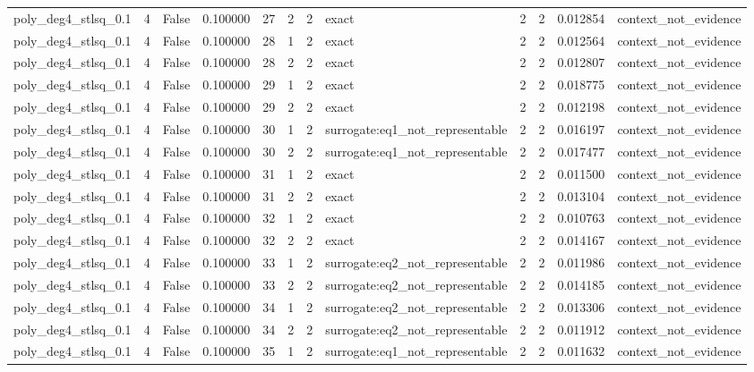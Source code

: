 \begin{tabular}{lrrrrrrlrrrl}
poly\_deg4\_stlsq\_0.1 & 4 & False & 0.100000 & 27 & 2 & 2 & exact & 2 & 2 & 0.012854 & context\_not\_evidence \\
poly\_deg4\_stlsq\_0.1 & 4 & False & 0.100000 & 28 & 1 & 2 & exact & 2 & 2 & 0.012564 & context\_not\_evidence \\
poly\_deg4\_stlsq\_0.1 & 4 & False & 0.100000 & 28 & 2 & 2 & exact & 2 & 2 & 0.012807 & context\_not\_evidence \\
poly\_deg4\_stlsq\_0.1 & 4 & False & 0.100000 & 29 & 1 & 2 & exact & 2 & 2 & 0.018775 & context\_not\_evidence \\
poly\_deg4\_stlsq\_0.1 & 4 & False & 0.100000 & 29 & 2 & 2 & exact & 2 & 2 & 0.012198 & context\_not\_evidence \\
poly\_deg4\_stlsq\_0.1 & 4 & False & 0.100000 & 30 & 1 & 2 & surrogate:eq1\_not\_representable & 2 & 2 & 0.016197 & context\_not\_evidence \\
poly\_deg4\_stlsq\_0.1 & 4 & False & 0.100000 & 30 & 2 & 2 & surrogate:eq1\_not\_representable & 2 & 2 & 0.017477 & context\_not\_evidence \\
poly\_deg4\_stlsq\_0.1 & 4 & False & 0.100000 & 31 & 1 & 2 & exact & 2 & 2 & 0.011500 & context\_not\_evidence \\
poly\_deg4\_stlsq\_0.1 & 4 & False & 0.100000 & 31 & 2 & 2 & exact & 2 & 2 & 0.013104 & context\_not\_evidence \\
poly\_deg4\_stlsq\_0.1 & 4 & False & 0.100000 & 32 & 1 & 2 & exact & 2 & 2 & 0.010763 & context\_not\_evidence \\
poly\_deg4\_stlsq\_0.1 & 4 & False & 0.100000 & 32 & 2 & 2 & exact & 2 & 2 & 0.014167 & context\_not\_evidence \\
poly\_deg4\_stlsq\_0.1 & 4 & False & 0.100000 & 33 & 1 & 2 & surrogate:eq2\_not\_representable & 2 & 2 & 0.011986 & context\_not\_evidence \\
poly\_deg4\_stlsq\_0.1 & 4 & False & 0.100000 & 33 & 2 & 2 & surrogate:eq2\_not\_representable & 2 & 2 & 0.014185 & context\_not\_evidence \\
poly\_deg4\_stlsq\_0.1 & 4 & False & 0.100000 & 34 & 1 & 2 & surrogate:eq2\_not\_representable & 2 & 2 & 0.013306 & context\_not\_evidence \\
poly\_deg4\_stlsq\_0.1 & 4 & False & 0.100000 & 34 & 2 & 2 & surrogate:eq2\_not\_representable & 2 & 2 & 0.011912 & context\_not\_evidence \\
poly\_deg4\_stlsq\_0.1 & 4 & False & 0.100000 & 35 & 1 & 2 & surrogate:eq1\_not\_representable & 2 & 2 & 0.011632 & context\_not\_evidence \\

\end{tabular}
